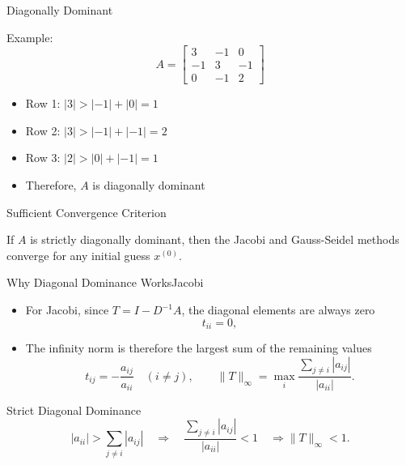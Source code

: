 \documentclass[10pt]{beamer}
\begin{document}
\begin{frame}{Diagonally Dominant}

    Example: 
        $$A = \begin{bmatrix}
    3 &-1 & 0\\
    -1 &3 &-1\\
    0 &-1 &2
    \end{bmatrix}$$
\begin{itemize}
    \item Row 1: $|3| > |-1| + |0| = 1 $ 
    \item Row 2: $|3| > |-1| + |-1| = 2 $
    \item Row 3: $|2| > |0| + |-1| = 1$
    \item Therefore, $A$ is diagonally dominant 
\end{itemize}
\end{frame}
\begin{frame}{Sufficient Convergence Criterion}
\begin{theorem}
	If $A$ is strictly diagonally dominant, then the Jacobi and Gauss-Seidel methods converge for any initial guess $x^{(0)}$.
\end{theorem}


\end{frame}

\begin{frame}{Why Diagonal Dominance Works}{Jacobi}

\begin{itemize}
    \item For Jacobi, since $T=I-D^{-1}A$, the diagonal elements are always zero
    \[
        t_{ii}=0,
    \]

    \item The infinity norm is therefore the largest sum of the remaining values
    \[
            t_{ij}=-\frac{a_{ij}}{a_{ii}}
        \quad (i\ne j),\qquad
        \|T\|_\infty
        =
        \max_i
        \frac{\sum_{j\ne i}|a_{ij}|}{|a_{ii}|}.
    \]
\end{itemize}

\begin{block}{Strict Diagonal Dominance}
\[
    |a_{ii}|>\sum_{j\ne i}|a_{ij}|
    \quad\Longrightarrow\quad 
    \frac{\sum_{j\ne i}|a_{ij}|}{|a_{ii}|}<1
    \quad\Longrightarrow
    \|T\|_\infty<1.
\]
\end{block}


\end{frame}
\end{document}
